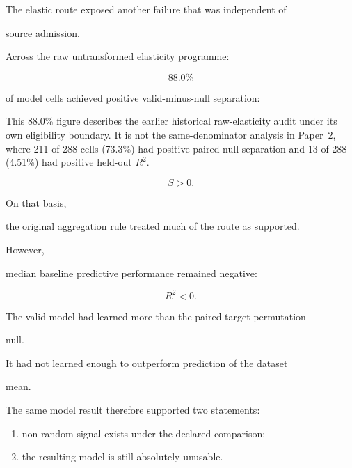 \documentclass[11pt,a4paper,oneside]{report}
\begin{document}
The elastic route exposed another failure that was independent of

source admission.



Across the raw untransformed elasticity programme:



\begin{equation}
88.0\%
\end{equation}



of model cells achieved positive valid-minus-null separation:

This 88.0\% figure describes the earlier historical raw-elasticity audit under its own eligibility boundary. It is not the same-denominator analysis in Paper~2, where 211 of 288 cells (73.3\%) had positive paired-null separation and 13 of 288 (4.51\%) had positive held-out $R^2$.



\begin{equation}
S>0.
\end{equation}



On that basis,

the original aggregation rule treated much of the route as supported.



However,

median baseline predictive performance remained negative:



\begin{equation}
R^2<0.
\end{equation}



The valid model had learned more than the paired target-permutation

null.



It had not learned enough to outperform prediction of the dataset

mean.



The same model result therefore supported two statements:



\begin{enumerate}



\item

non-random signal exists under the declared comparison;



\item

the resulting model is still absolutely unusable.



\end{enumerate}
\end{document}
